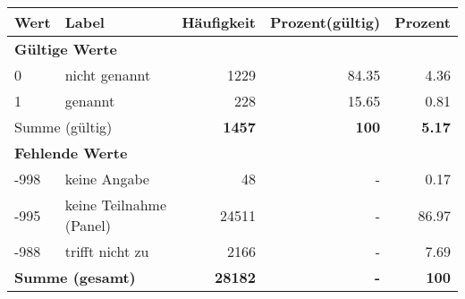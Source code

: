      \begin{longtable}{lXrrr}
     \toprule
     \textbf{Wert} & \textbf{Label} & \textbf{Häufigkeit} & \textbf{Prozent(gültig)} & \textbf{Prozent} \\
     \endhead
     \midrule
     \multicolumn{5}{l}{\textbf{Gültige Werte}}\\

     0 &
     \multicolumn{1}{X}{ nicht genannt   } &


       \num{1229} &
       \num[round-mode=places,round-precision=2]{84.35} &
         \num[round-mode=places,round-precision=2]{4.36} \\

     1 &
     \multicolumn{1}{X}{ genannt   } &


       \num{228} &
       \num[round-mode=places,round-precision=2]{15.65} &
         \num[round-mode=places,round-precision=2]{0.81} \\
     \midrule
     \multicolumn{2}{l}{Summe (gültig)} &
       \textbf{\num{1457}} &
     \textbf{\num{100}} &
       \textbf{\num[round-mode=places,round-precision=2]{5.17}} \\
     \multicolumn{5}{l}{\textbf{Fehlende Werte}}\\
       -998 &
       keine Angabe &
         \num{48} &
        - &
         \num[round-mode=places,round-precision=2]{0.17} \\
       -995 &
       keine Teilnahme (Panel) &
         \num{24511} &
        - &
         \num[round-mode=places,round-precision=2]{86.97} \\
       -988 &
       trifft nicht zu &
         \num{2166} &
        - &
         \num[round-mode=places,round-precision=2]{7.69} \\
     \midrule
     \multicolumn{2}{l}{\textbf{Summe (gesamt)}} &
          \textbf{\num{28182}} &
        \textbf{-} &
        \textbf{\num{100}} \\
     \bottomrule
     \end{longtable}
     
